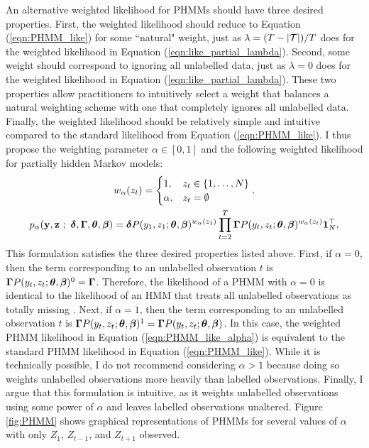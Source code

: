 An alternative weighted likelihood for PHMMs should have three desired properties. First, the weighted likelihood should reduce to Equation (\ref{eqn:PHMM_like}) for some ``natural" weight, just as $\lambda = (T-|\mathcal{T}|)/T$ does for the weighted likelihood in Equation (\ref{eqn:like_partial_lambda}). Second, some weight should correspond to ignoring all unlabelled data, just as $\lambda = 0$ does for the weighted likelihood in Equation (\ref{eqn:like_partial_lambda}). These two properties allow practitioners to intuitively select a weight that balances a natural weighting scheme with one that completely ignores all unlabelled data. Finally, the weighted likelihood should be relatively simple and intuitive compared to the standard likelihood from Equation (\ref{eqn:PHMM_like}). I thus propose the weighting parameter $\alpha \in [0,1]$ and the following weighted likelihood for partially hidden Markov models:
%
\begin{gather}
    w_\alpha(z_t) = \begin{cases}
        1,        & z_t \in \{1,\ldots,N\} \\
        \alpha,   & z_t = \emptyset
    \end{cases}, \\
    p_\alpha(\mathbf{y},\mathbf{z} ~;~ \boldsymbol{\delta}, \boldsymbol{\Gamma}, \boldsymbol{\theta},\boldsymbol{\beta}) = \boldsymbol{\delta} P(y_1,z_1;\boldsymbol{\theta},\boldsymbol{\beta})^{w_\alpha(z_1)} \prod_{t=2}^T \boldsymbol{\Gamma} P(y_t,z_t;\boldsymbol{\theta},\boldsymbol{\beta})^{w_\alpha(z_t)} \mathbf{1}^\top_N,
    \label{eqn:PHMM_like_alpha}
\end{gather} 
%
This formulation satisfies the three desired properties listed above. First, if $\alpha = 0$, then the term corresponding to an unlabelled observation $t$ is $\boldsymbol{\Gamma} P(y_t,z_t;\boldsymbol{\theta},\boldsymbol{\beta})^{0} = \boldsymbol{\Gamma}$. Therefore, the likelihood of a PHMM with $\alpha = 0$ is identical to the likelihood of an HMM that treats all unlabelled observations as totally missing \citep{Zucchini:2016}. Next, if $\alpha = 1$, then the term corresponding to an unlabelled observation $t$ is $\boldsymbol{\Gamma} P(y_t,z_t;\boldsymbol{\theta},\boldsymbol{\beta})^{1} = \boldsymbol{\Gamma} P(y_t,z_t;\boldsymbol{\theta},\boldsymbol{\beta})$. In this case, the weighted PHMM likelihood in Equation (\ref{eqn:PHMM_like_alpha}) is equivalent to the standard PHMM likelihood in Equation (\ref{eqn:PHMM_like}). While it is technically possible, I do not recommend considering $\alpha > 1$ because doing so weights unlabelled observations more heavily than labelled observations. Finally, I argue that this formulation is intuitive, as it weights unlabelled observations using some power of $\alpha$ and leaves labelled observations unaltered. Figure \ref{fig:PHMM} shows graphical representations of PHMMs for several values of $\alpha$ with only $Z_1$, $Z_{t-1}$, and $Z_{t+1}$ observed.

